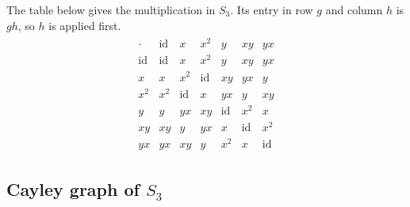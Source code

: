 \documentclass[reqno,11pt]{amsart}
\theoremstyle{definition}
\newtheorem{example}{Example}[section]
\theoremstyle{plain}
\theoremstyle{remark}
\numberwithin{equation}{section}
\newcommand{\id}{\operatorname{id}}
\newcommand{\be}{\begin{eqnarray}}
\newcommand{\ee}{\end{eqnarray}}
\begin{document}
The table below gives the multiplication in $S_3$. Its entry in row $g$ and
column $h$ is $gh$, so $h$ is applied first.
\be
\begin{array}{c|cccccc}
	\cdot & \id & x & x^2 & y & xy & yx \\ \hline
	\id & \id & x & x^2 & y & xy & yx \\
	x & x & x^2 & \id & xy & yx & y \\
	x^2 & x^2 & \id & x & yx & y & xy \\
	y & y & yx & xy & \id & x^2 & x \\
	xy & xy & y & yx & x & \id & x^2 \\
	yx & yx & xy & y & x^2 & x & \id
\end{array}
\ee
%


\subsection*{Cayley graph of $S_3$}
\mbox{}\par\vspace{-0.5em}
\end{document}
